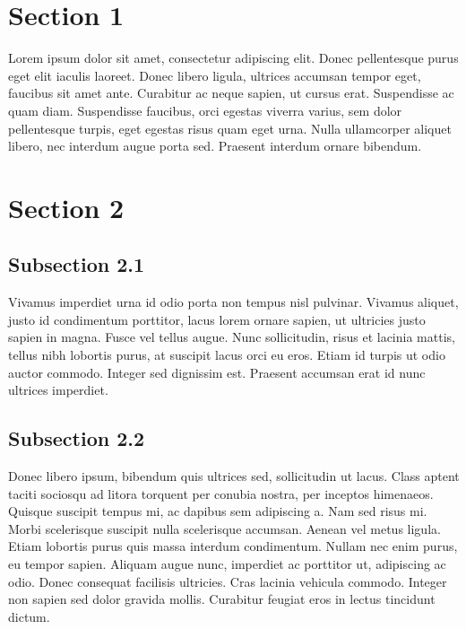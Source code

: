 \begin{multicols}{2}
\section{Section 1}
Lorem ipsum dolor sit amet, consectetur adipiscing elit. Donec pellentesque
purus eget elit iaculis laoreet. Donec libero ligula, ultrices accumsan tempor
eget, faucibus sit amet ante. Curabitur ac neque sapien, ut cursus erat.
Suspendisse ac quam diam. Suspendisse faucibus, orci egestas viverra varius, sem
dolor pellentesque turpis, eget egestas risus quam eget urna. Nulla ullamcorper 
aliquet libero, nec interdum augue porta sed. Praesent interdum ornare bibendum.

\section{Section 2}
\subsection{Subsection 2.1}

Vivamus imperdiet urna id odio porta non tempus nisl pulvinar. Vivamus aliquet,
justo id condimentum porttitor, lacus lorem ornare sapien, ut ultricies justo
sapien in magna. Fusce vel tellus augue. Nunc sollicitudin, risus et lacinia
mattis, tellus nibh lobortis purus, at suscipit lacus orci eu eros. Etiam id
turpis ut odio auctor commodo. Integer sed dignissim est. Praesent accumsan erat
id nunc ultrices imperdiet.

\subsection{Subsection 2.2}

Donec libero ipsum, bibendum quis ultrices sed, sollicitudin ut lacus. Class aptent taciti sociosqu ad litora torquent per conubia nostra, per inceptos himenaeos. Quisque suscipit tempus mi, ac dapibus sem adipiscing a. Nam sed risus mi. Morbi scelerisque suscipit nulla scelerisque accumsan. Aenean vel metus ligula. Etiam lobortis purus quis massa interdum condimentum. Nullam nec enim purus, eu tempor sapien. Aliquam augue nunc, imperdiet ac porttitor ut, adipiscing ac odio. Donec consequat facilisis ultricies. Cras lacinia vehicula commodo. Integer non sapien sed dolor gravida mollis. Curabitur feugiat eros in lectus tincidunt dictum.


\end{multicols}
